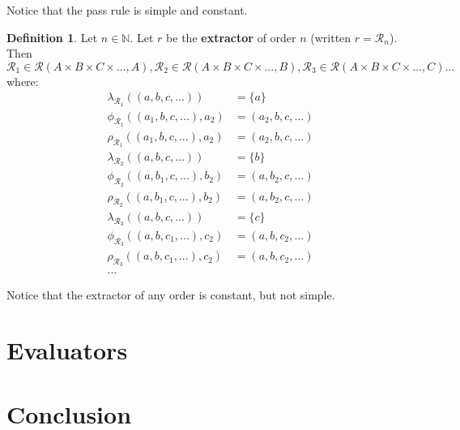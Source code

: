 \documentclass{article}
\theoremstyle{definition}
\newtheorem{definition}{Definition}[subsection]
\theoremstyle{plain}
\def\rule{\mathcal{R}}
\begin{document}
Notice that the pass rule is simple and constant.

\begin{definition}
  Let $ n \in \mathbb{N} $.
  Let $ r $ be the \textbf{extractor} of order $ n $
  (written $ r = \rule_n $).
  Then $ \rule_1 \in \rule (A \times B \times C \times ..., A),
         \rule_2 \in \rule (A \times B \times C \times ..., B),
         \rule_3 \in \rule (A \times B \times C \times ..., C) ... $ where:
  \begin{align}
    \lambda_{\rule_1} ((a, b, c, ...))        & = \{ a \} \\
       \phi_{\rule_1} ((a_1, b, c, ...), a_2) & = (a_2, b, c, ...) \\
       \rho_{\rule_1} ((a_1, b, c, ...), a_2) & = (a_2, b, c, ...) \\
    \lambda_{\rule_2} ((a, b, c, ...))        & = \{ b \} \\
       \phi_{\rule_2} ((a, b_1, c, ...), b_2) & = (a, b_2, c, ...) \\
       \rho_{\rule_2} ((a, b_1, c, ...), b_2) & = (a, b_2, c, ...) \\
    \lambda_{\rule_3} ((a, b, c, ...))        & = \{ c \} \\
       \phi_{\rule_3} ((a, b, c_1, ...), c_2) & = (a, b, c_2, ...) \\
       \rho_{\rule_3} ((a, b, c_1, ...), c_2) & = (a, b, c_2, ...) \\
       ... \nonumber
  \end{align}
\end{definition}

Notice that the extractor of any order is constant, but not simple.

\section{Evaluators}

\section{Conclusion}
\end{document}
